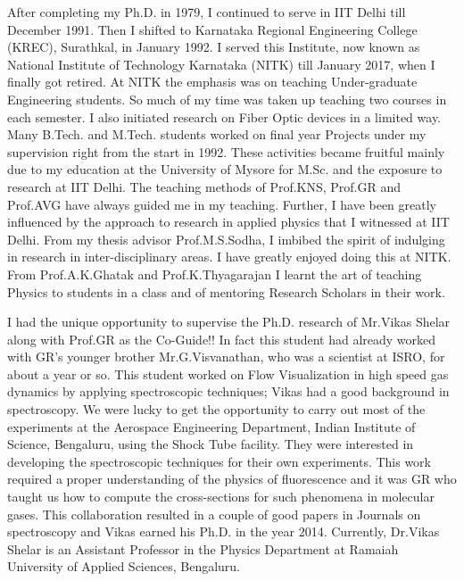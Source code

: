 After completing my Ph.D. in 1979, I continued to serve in IIT Delhi till December 1991. Then I shifted to Karnataka Regional Engineering College (KREC), Surathkal, in January 1992. I served this Institute, now known as National Institute of Technology Karnataka (NITK) till January 2017, when I finally got retired. At NITK the emphasis was on teaching Under-graduate Engineering students. So much of my time was taken up teaching two courses in each semester. I also initiated research on Fiber Optic devices in a limited way. Many B.Tech. and M.Tech. students worked on final year Projects under my supervision right from the start in 1992. These activities became fruitful mainly due to my education at the University of Mysore for M.Sc. and the exposure to research at IIT Delhi. The teaching methods of Prof.KNS, Prof.GR and Prof.AVG have always guided me in my teaching. Further, I have been greatly influenced by the approach to research in applied physics that I witnessed at IIT Delhi. From my thesis advisor Prof.M.S.Sodha, I imbibed the spirit of indulging in research in inter-disciplinary areas. I have greatly enjoyed doing this at NITK. From Prof.A.K.Ghatak and Prof.K.Thyagarajan I learnt the art of teaching Physics to students in a class and of mentoring Research Scholars in their work.  

I had the unique opportunity to supervise the Ph.D. research of Mr.Vikas Shelar along with Prof.GR as the Co-Guide!! In fact this student had already worked with GR's younger brother Mr.G.Visvanathan, who was a scientist at ISRO, for about a year or so. This student worked on Flow Visualization in high speed gas dynamics by applying spectroscopic techniques; Vikas had a good background in spectroscopy. We were lucky to get the opportunity to carry out most of the experiments at the Aerospace Engineering Department, Indian Institute of Science, Bengaluru, using the Shock Tube facility. They were interested in developing the spectroscopic techniques for their own experiments. This work required a proper understanding of the physics of fluorescence and it was GR who taught us how to compute the cross-sections for such phenomena in molecular gases. This collaboration resulted in a couple of good papers in Journals on spectroscopy and Vikas earned his Ph.D. in the year 2014. Currently, Dr.Vikas Shelar is an Assistant Professor in the Physics Department at Ramaiah University of Applied Sciences, Bengaluru.

